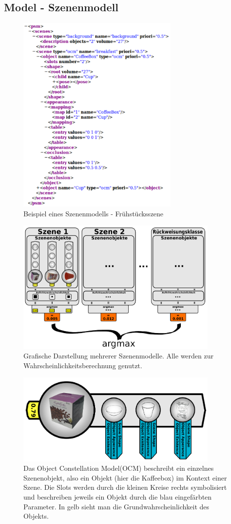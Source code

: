 \subsection{Model - Szenenmodell}
\begin{figure}
	\centering
	\includegraphics[width=8cm]{bilder/Modell.pdf}
	\caption{Beispiel eines Szenenmodells - Frühstücksszene \cite{gehrung14}}
	\label{img:modelexample}
\end{figure}
\begin{figure}
	\centering
	\includegraphics[width=10cm]{bilder/argmax.pdf}
	\caption{Grafische Darstellung mehrerer Szenenmodelle. Alle werden zur Wahrscheinlichkeitsberechnung genutzt. \cite{gehrung14}}
	\label{img:argmax}
\end{figure}
\begin{figure}
	\centering
	\includegraphics[width=10cm]{bilder/terms.pdf}
	\caption{Das Object Constellation Model(OCM) beschreibt ein einzelnes Szenenobjekt,
also ein Objekt (hier die Kaffeebox) im Kontext einer Szene. Die Slots
werden durch die kleinen Kreise rechts symbolisiert und beschreiben jeweils ein Objekt durch die blau eingefärbten Parameter. In gelb sieht man die Grundwahrscheinlichkeit des Objekts. \cite{gehrung14}}
	\label{img:terms}
\end{figure}
